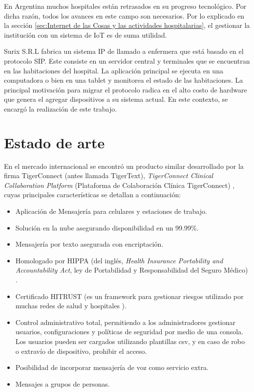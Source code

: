 En Argentina muchos hospitales están retrasados en su progreso tecnológico. Por dicha razón, todos los avances en este campo son  necesarios. Por lo explicado en la sección \ref{sec:Internet de las Cosas y las actividades hospitalarias}, el gestionar la institución con un sistema de IoT es de suma utilidad.

Surix S.R.L fabrica un sistema IP de llamado a enfermera que está basado en el protocolo SIP. Este consiste en un servidor central y terminales que se encuentran en las habitaciones del hospital. La aplicación principal se ejecuta en una computadora o bien en una tablet y monitorea el estado
de las habitaciones. La principal motivación para migrar el protocolo radica en el alto costo de hardware que genera el agregar dispositivos a su sistema actual. En este contexto, se encargó la realización de este trabajo.



\section{Estado de arte}
\label{Estado de arte}

En el mercado internacional se encontró un producto similar  desarrollado por la firma TigerConnect (antes llamada TigerText), \textit{TigerConnect Clinical Collaboration Platform} (Plataforma de Colaboración Clínica TigerConnect) \citep{WEBSITE:2}, cuyas principales características se detallan a continuación:
\begin{itemize}
\item Aplicación de Mensajería para celulares y estaciones de trabajo.
\item Solución en la nube asegurando disponibilidad en un 99.99\%.
\item Mensajería por texto asegurada con encriptación.  
\item Homologado por HIPPA (del inglés, \textit{Health Insurance Portability and Accountability Act}, ley de Portabilidad y Responsabilidad del Seguro Médico)  \citep{WEBSITE:3}.  
\item Certificado HITRUST (es un framework para gestionar riesgos utilizado por muchas redes de salud y hospitales \citep{WEBSITE:1}).  
\item Control administrativo total, permitiendo a los administradores gestionar usuarios, configuraciones y políticas de seguridad por medio de una consola. Los usuarios pueden ser cargados utilizando plantillas csv, y en caso de robo o extravío de dispositivo, prohibir el acceso.  
\item Posibilidad de incorporar mensajería de voz como servicio extra.  
\item Mensajes a grupos de personas.  
\end{itemize}

